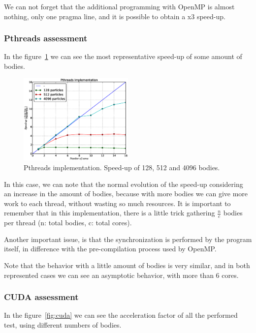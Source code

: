 We can not forget that the additional programming with OpenMP
is almost nothing, only one pragma line, and it is possible to obtain
a x3 speed-up.

\subsubsection{Pthreads assessment}

In the figure~\ref{fig:pthread} we can see the most representative speed-up of some
amount of bodies.

\begin{figure}[h!t]
    \centering
    \includegraphics[width=0.5\textwidth]{images/pthreads.eps}
    \caption{Pthreads implementation. Speed-up of 128, 512 and 4096 bodies.}
    \label{fig:pthread}
\end{figure}

In this case, we can note that the normal evolution of the speed-up
considering an increase in the amount of bodies, because with more bodies
we can give more work to each thread, without wasting so much resources.
It is important to remember that in this implementation, there is a little trick
gathering $\frac{n}{c}$ bodies per thread (n: total bodies, c: total cores).

Another important issue, is that the synchronization is performed by the program
itself, in difference with the pre-compilation process used by OpenMP.

Note that the behavior with a little amount of bodies is very similar,
and in both represented cases we can see an asymptotic behavior,
with more than 6 cores.

\subsubsection{CUDA assessment}

In the figure~\ref{fig:cuda} we can see the acceleration factor of all
the performed test, using different numbers of bodies.

